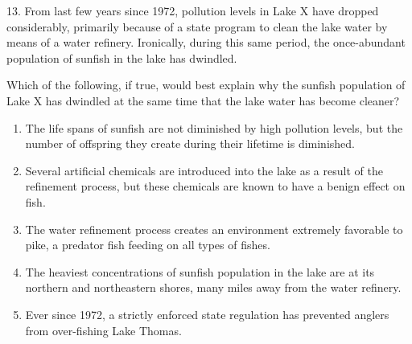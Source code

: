 \documentclass[12pt]{article}
\begin{document}
\begin{enumerate}[label=\textbf{\arabic*.}, start=1]
13. From last few years since 1972, pollution levels in Lake X have dropped considerably, primarily because of a state program to clean the lake water by means of a water refinery. Ironically, during this same period, the once-abundant population of sunfish in the lake has dwindled.

 Which of the following, if true, would best explain why the sunfish population of Lake X has dwindled at the same time that the lake water has become cleaner?


\begin{enumerate}[label=(\Alph*)]
    \item The life spans of sunfish are not diminished by high pollution levels, but the number of offspring they create during their lifetime is diminished.
    \item Several artificial chemicals are introduced into the lake as a result of the refinement process, but these chemicals are known to have a benign effect on fish.
    \item The water refinement process creates an environment extremely favorable to pike, a predator fish feeding on all types of fishes.
    \item The heaviest concentrations of sunfish population in the lake are at its northern and northeastern shores, many miles away from the water refinery.
    \item Ever since 1972, a strictly enforced state regulation has prevented anglers from over-fishing Lake Thomas.
\end{enumerate}


\end{enumerate}
\end{document}
